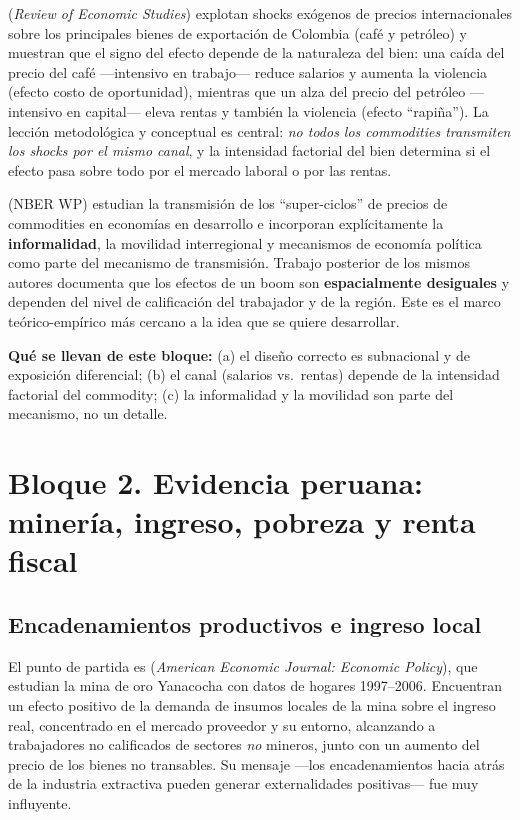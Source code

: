 \documentclass[11pt]{article}
\begin{document}
\citet{dube2013} (\textit{Review of Economic Studies}) explotan shocks exógenos de precios
internacionales sobre los principales bienes de exportación de Colombia (café y petróleo) y
muestran que el signo del efecto depende de la naturaleza del bien: una caída del precio del
café —intensivo en trabajo— reduce salarios y aumenta la violencia (efecto costo de
oportunidad), mientras que un alza del precio del petróleo —intensivo en capital— eleva
rentas y también la violencia (efecto ``rapiña''). La lección metodológica y conceptual es
central: \emph{no todos los commodities transmiten los shocks por el mismo canal}, y la
intensidad factorial del bien determina si el efecto pasa sobre todo por el mercado laboral o
por las rentas.

\citet{benguria2018} (NBER WP) estudian la transmisión de los ``super-ciclos'' de precios de
commodities en economías en desarrollo e incorporan explícitamente la \textbf{informalidad},
la movilidad interregional y mecanismos de economía política como parte del mecanismo de
transmisión. Trabajo posterior de los mismos autores \citep{benguria2024} documenta que los
efectos de un boom son \textbf{espacialmente desiguales} y dependen del nivel de calificación
del trabajador y de la región. Este es el marco teórico-empírico más cercano a la idea que se
quiere desarrollar.

\medskip
\noindent\textbf{Qué se llevan de este bloque:} (a) el diseño correcto es subnacional y de
exposición diferencial; (b) el canal (salarios vs.\ rentas) depende de la intensidad
factorial del commodity; (c) la informalidad y la movilidad son parte del mecanismo, no un
detalle.

\section{Bloque 2. Evidencia peruana: minería, ingreso, pobreza y renta fiscal}

\subsection{Encadenamientos productivos e ingreso local}
El punto de partida es \citet{aragon2013} (\textit{American Economic Journal: Economic
Policy}), que estudian la mina de oro Yanacocha con datos de hogares 1997--2006. Encuentran un
efecto positivo de la demanda de insumos locales de la mina sobre el ingreso real,
concentrado en el mercado proveedor y su entorno, alcanzando a trabajadores no calificados de
sectores \emph{no} mineros, junto con un aumento del precio de los bienes no transables. Su
mensaje —los encadenamientos hacia atrás de la industria extractiva pueden generar
externalidades positivas— fue muy influyente.
\end{document}
